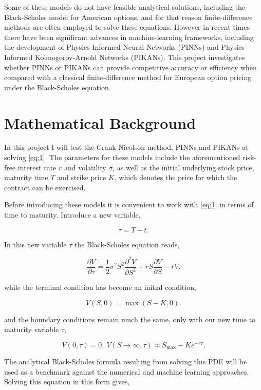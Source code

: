 \documentclass[11pt,a4paper]{article}
\begin{document}
Some of these models do not have feasible analytical solutions, including the Black-Scholes model for American options, and for that reason finite-difference methods are often employed to solve these equations. However in recent times there have been significant advances in machine-learning frameworks, including the development of Physics-Informed Neural Networks (PINNs) and Physics-Informed Kolmogorov-Arnold Networks (PIKANs). This project investigates whether PINNs or PIKANs can provide competitive accuracy or efficiency when compared with a classical finite-difference method for European option pricing under the Black-Scholes equation.

\section{Mathematical Background}

In this project I will test the Crank-Nicolson method, PINNs and PIKANs at solving \eqref{eq:1}. The parameters for these models include the aforementioned risk-free interest rate $r$ and volatility $\sigma$, as well as the initial underlying stock price, maturity time $T$ and strike price $K$, which denotes the price for which the contract can be exercised.

Before introducing these models it is convenient to work with \eqref{eq:1} in terms of time to maturity. Introduce a new variable,

$$\tau = T-t.$$

In this new variable $\tau$ the Black-Scholes equation reads,

\begin{equation}\label{eq:2}
    \frac{\partial V}{\partial \tau}
=
\frac{1}{2}\sigma^2 S^2 \frac{\partial^2 V}{\partial S^2}
+ rS \frac{\partial V}{\partial S}
- rV.
\end{equation}

while the terminal condition has become an initial condition,

$$ V(S,0) = \max(S-K,0). $$

and the boundary conditions remain much the same, only with our new time to maturity variable $\tau$,

$$V(0, \tau) = 0, \ V(S \to \infty, \tau) \approx S_{\max} - K e^{-r\tau}.$$

The analytical Black-Scholes formula resulting from solving this PDE will be used as a benchmark against the numerical and machine learning approaches. Solving this equation in this form gives,
\end{document}
